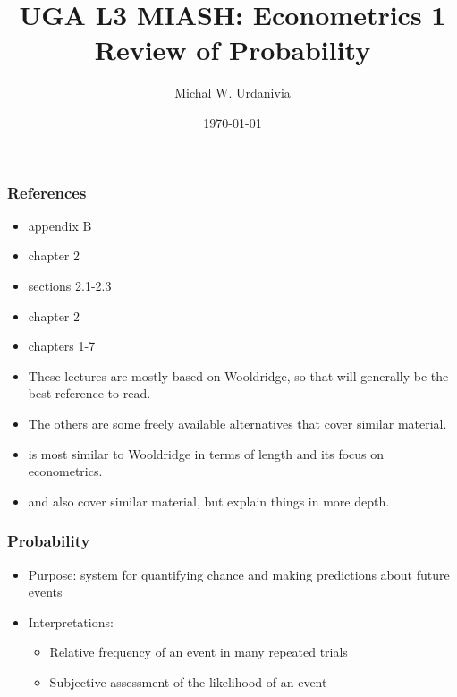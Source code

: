 


\title[Econometrics 1: Probability]{UGA L3 MIASH: Econometrics 1\\
  \textbf{Review of Probability}}
\date{\today}
\author{Michal W. Urdanivia\inst{*}}




\frame{\titlepage}

\begin{frame}
  \tableofcontents  
\end{frame}

\begin{frame}\frametitle{References}
  \begin{itemize}
  \item \cite{w2013} appendix B
  \item \cite{sw2009} chapter 2
  \item \cite{abbring2001} sections 2.1-2.3
  \item \cite{dbc2012} chapter 2 
  \item \cite{gs2003} chapters 1-7
  \end{itemize}

\begin{itemize}
\item These lectures are mostly based on Wooldridge, so that will
generally be the best reference to read. 
\item The others are some
freely available alternatives that cover similar
material. 
\item \cite{abbring2001} is most similar to Wooldridge in
terms of length and its focus on econometrics. 
\item \cite{dbc2012} and
\cite{gs2003} also cover similar material, but explain things in
more depth.
\end{itemize}
\end{frame}

\begin{frame}[allowframebreaks] \frametitle{Probability}
  \begin{itemize}
  \item Purpose: system for quantifying chance and making predictions
    about future events 
  \item Interpretations:
    \begin{itemize}
    \item Relative frequency of an event in many repeated trials
    \item Subjective assessment of the likelihood of an event
    \end{itemize}
  \end{itemize}
\end{frame}

